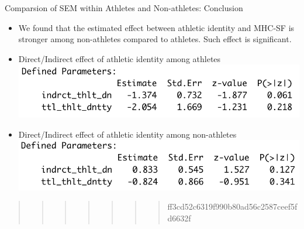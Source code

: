 \documentclass[
  ignorenonframetext,
]{beamer}
\begin{document}
\begin{frame}{Comparsion of SEM within Athletes and Non-athletes:
Conclusion}
\protect\hypertarget{comparsion-of-sem-within-athletes-and-non-athletes-conclusion}{}
\begin{itemize}
\item
  We found that the estimated effect between athletic identity and
  MHC-SF is stronger among non-athletes compared to athletes. Such
  effect is significant.
\item
  Direct/Indirect effect of athletic identity among athletes
  \includegraphics{images/athlete_unstandardized_direct_indirect.png}
\item
  Direct/Indirect effect of athletic identity among non-athletes
  \includegraphics{images/non_athlete_unstandardized_direct_indirect.png}
\end{itemize}

\begin{quote}
\begin{quote}
\begin{quote}
\begin{quote}
\begin{quote}
\begin{quote}
\begin{quote}
ff3cd52c6319f990b80ad56c2587ceef5fd6632f
\end{quote}
\end{quote}
\end{quote}
\end{quote}
\end{quote}
\end{quote}
\end{quote}
\end{frame}
\end{document}
